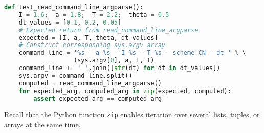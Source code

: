 \documentclass[graybox,sectrefs,envcountresetchap,open=right,final]{svmonodo}
\begin{document}
\begin{lstlisting}[language=python,style=blue1_bluegreen]
def test_read_command_line_argparse():
    I = 1.6;  a = 1.8;  T = 2.2;  theta = 0.5
    dt_values = [0.1, 0.2, 0.05]
    # Expected return from read_command_line_argparse
    expected = [I, a, T, theta, dt_values]
    # Construct corresponding sys.argv array
    command_line = '%s --a %s --I %s --T %s --scheme CN --dt ' % \ 
                   (sys.argv[0], a, I, T)
    command_line += ' '.join([str(dt) for dt in dt_values])
    sys.argv = command_line.split()
    computed = read_command_line_argparse()
    for expected_arg, computed_arg in zip(expected, computed):
        assert expected_arg == computed_arg

\end{lstlisting}

Recall that the Python function \texttt{zip} enables iteration over
several lists, tuples, or arrays at the same time.
\end{document}
